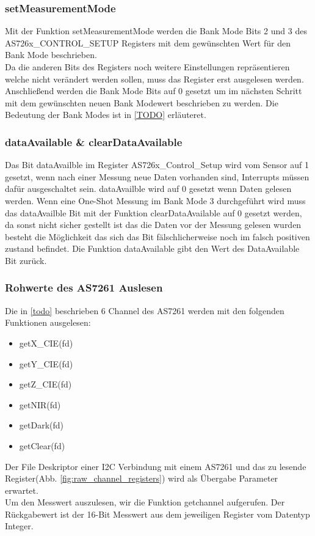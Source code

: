 \subsubsection{setMeasurementMode}
Mit der Funktion setMeasurementMode werden die Bank Mode Bits 2 und 3 des \\
AS726x\_CONTROL\_SETUP Registers mit dem gewünschten Wert für den Bank Mode beschrieben.\\
Da die anderen Bits des Registers noch weitere Einstellungen repräsentieren welche nicht verändert werden sollen, muss das Register erst ausgelesen werden.
Anschließend werden die Bank Mode Bits auf 0 gesetzt um im nächsten Schritt mit dem gewünschten neuen Bank Modewert beschrieben zu werden. 
Die Bedeutung der Bank Modes ist in \ref{TODO} erläuteret.

\subsubsection{dataAvailable \& clearDataAvailable}
Das Bit dataAvailble im Register AS726x\_Control\_Setup wird vom Sensor auf 1 gesetzt, wenn nach einer Messung neue Daten vorhanden sind, Interrupts müssen dafür ausgeschaltet sein.
dataAvailble wird auf 0 gesetzt wenn Daten gelesen werden.
Wenn eine One-Shot Messung im Bank Mode 3 durchgeführt wird muss das dataAvailble Bit mit der Funktion clearDataAvailable auf 0 gesetzt werden, da sonst nicht sicher gestellt ist das die Daten vor der Messung gelesen wurden besteht die Möglichkeit das sich das Bit fälschlicherweise noch im falsch positiven zustand befindet.
Die Funktion dataAvailable gibt den Wert des DataAvailable Bit zurück.\\

%

\subsubsection{Rohwerte des AS7261 Auslesen}
Die in \ref{todo} beschrieben 6 Channel des AS7261 werden mit den folgenden Funktionen ausgelesen:
\begin{itemize}
	\item getX\_CIE(fd)
	\item getY\_CIE(fd)
	\item getZ\_CIE(fd)
	\item getNIR(fd)
	\item getDark(fd) 
	\item getClear(fd)
\end{itemize}
Der File Deskriptor einer I2C Verbindung mit einem AS7261 und das zu lesende Register(Abb. \ref{fig:raw_channel_registers}) wird als Übergabe Parameter erwartet.\\
Um den Messwert auszulesen, wir die Funktion getchannel aufgerufen.
Der Rückgabewert ist der 16-Bit Messwert aus dem jeweiligen Register vom Datentyp Integer.


